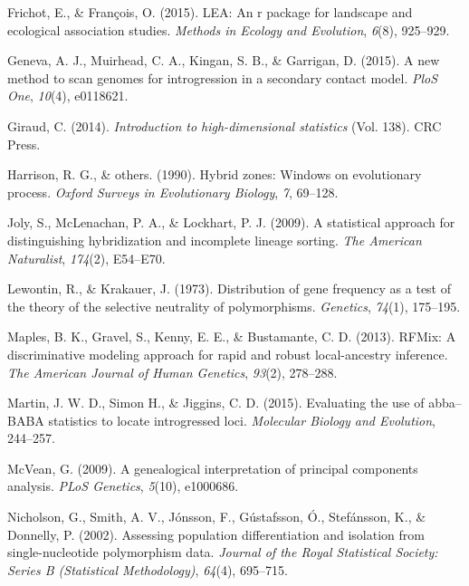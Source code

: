 \documentclass[12pt,twoside]{reedthesis}
\begin{document}
  \hypertarget{ref-frichot2015lea}{}
  Frichot, E., \& François, O. (2015). LEA: An r package for landscape and
  ecological association studies. \emph{Methods in Ecology and Evolution},
  \emph{6}(8), 925--929.
  
  \hypertarget{ref-geneva2015new}{}
  Geneva, A. J., Muirhead, C. A., Kingan, S. B., \& Garrigan, D. (2015). A
  new method to scan genomes for introgression in a secondary contact
  model. \emph{PloS One}, \emph{10}(4), e0118621.
  
  \hypertarget{ref-giraud2014introduction}{}
  Giraud, C. (2014). \emph{Introduction to high-dimensional statistics}
  (Vol. 138). CRC Press.
  
  \hypertarget{ref-harrison1990hybrid}{}
  Harrison, R. G., \& others. (1990). Hybrid zones: Windows on
  evolutionary process. \emph{Oxford Surveys in Evolutionary Biology},
  \emph{7}, 69--128.
  
  \hypertarget{ref-joly2009statistical}{}
  Joly, S., McLenachan, P. A., \& Lockhart, P. J. (2009). A statistical
  approach for distinguishing hybridization and incomplete lineage
  sorting. \emph{The American Naturalist}, \emph{174}(2), E54--E70.
  
  \hypertarget{ref-lewontin1973distribution}{}
  Lewontin, R., \& Krakauer, J. (1973). Distribution of gene frequency as
  a test of the theory of the selective neutrality of polymorphisms.
  \emph{Genetics}, \emph{74}(1), 175--195.
  
  \hypertarget{ref-maples2013rfmix}{}
  Maples, B. K., Gravel, S., Kenny, E. E., \& Bustamante, C. D. (2013).
  RFMix: A discriminative modeling approach for rapid and robust
  local-ancestry inference. \emph{The American Journal of Human Genetics},
  \emph{93}(2), 278--288.
  
  \hypertarget{ref-martin2000}{}
  Martin, J. W. D., Simon H., \& Jiggins, C. D. (2015). Evaluating the use
  of abba--BABA statistics to locate introgressed loci. \emph{Molecular
  Biology and Evolution}, 244--257.
  
  \hypertarget{ref-mcvean2009genealogical}{}
  McVean, G. (2009). A genealogical interpretation of principal components
  analysis. \emph{PLoS Genetics}, \emph{5}(10), e1000686.
  
  \hypertarget{ref-nicholson2002assessing}{}
  Nicholson, G., Smith, A. V., Jónsson, F., Gústafsson, Ó., Stefánsson,
  K., \& Donnelly, P. (2002). Assessing population differentiation and
  isolation from single-nucleotide polymorphism data. \emph{Journal of the
  Royal Statistical Society: Series B (Statistical Methodology)},
  \emph{64}(4), 695--715.
  
\end{document}
